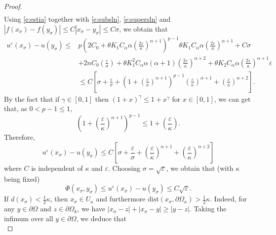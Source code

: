 \documentclass[11pt,reqno]{amsart}
\numberwithin{figure}{section}
\theoremstyle{plain}
\theoremstyle{remark}
\numberwithin{equation}{section}
\begin{document}
\begin{proof}
\begin{align}
\end{align}
Using \eqref{e:estia} together with \eqref{e:subsln}, \eqref{e:supersln} and $|f(x_\sigma) - f(y_\sigma)|\leq C|x_\sigma - y_\sigma|\leq C\sigma$, we obtain that
\begin{align*}
     u^\varepsilon(x_\sigma) - u(y_\sigma) \leq & p\left(2C_0+\theta K_1 C_\alpha \alpha\left( \frac{2\varepsilon}{\kappa}\right)^{\alpha+1}\right)^{p-1}\theta K_1 C_\alpha \alpha \left(\frac{2\varepsilon}{\kappa}\right)^{\alpha+1} + C\sigma\nonumber\\
    &+2nC_0\left(\frac{\varepsilon}{\sigma}\right) + \theta K_1^2C_\alpha \alpha(\alpha+1)\left(\frac{2\varepsilon}{\kappa}\right)^{\alpha+2} + \theta K_2 C_\alpha \alpha  \left(\frac{2\varepsilon}{\kappa}\right)^{\alpha+1}\varepsilon\nonumber\\
    &\leq C\left[\sigma + \frac{\varepsilon}{\sigma} + \left(1+\left(\frac{\varepsilon}{\kappa}\right)^{\alpha+1}\right)^{p-1}\left(\frac{\varepsilon}{\kappa}\right)^{\alpha+1} + \left(\frac{\varepsilon}{\kappa}\right)^{\alpha+2} \right].
\end{align*}
By the fact that if $\gamma\in [0,1]$ then $(1+x)^\gamma \leq 1+x^\gamma$ for $x\in [0,1]$, we can get that, as $0<p-1\leq 1$,
\begin{equation*}
    \left(1+\left(\frac{\varepsilon}{\kappa}\right)^{\alpha+1}\right)^{p-1} \leq 1+ \left(\frac{\varepsilon}{\kappa}\right).
\end{equation*}
Therefore,
\begin{equation*}
     u^\varepsilon(x_\sigma) - u(y_\sigma) \leq C\left[\sigma + \frac{\varepsilon}{\sigma} + \left(\frac{\varepsilon}{\kappa}\right)^{\alpha+1} + \left(\frac{\varepsilon}{\kappa}\right)^{\alpha+2}\right]
\end{equation*}
where $C$ is independent of $\kappa$ and $\varepsilon$. Choosing $\sigma = \sqrt{\varepsilon}$, we obtain that (with $\kappa$ being fixed)
\begin{equation}\label{e:final1}
    \Phi(x_\sigma,y_\sigma) \leq u^\varepsilon(x_\sigma) - u(y_\sigma) \leq C\sqrt{\varepsilon}.
\end{equation}
If $d(x_\sigma) < \frac{1}{2}\kappa$, then $x_\sigma \in U_\kappa$ and furthermore $\mathrm{dist}(x_\sigma,\partial \Omega_\kappa) > \frac{1}{2}\kappa$. Indeed, for any $y\in\partial\Omega$ and $z\in \partial\Omega_k$, we have $|x_\sigma - z| + |x_\sigma - y| \geq |y-z|$. Taking the infimum over all $y\in \partial\Omega$, we deduce that
\begin{equation*}

\end{equation*}
\end{proof}
\end{document}
